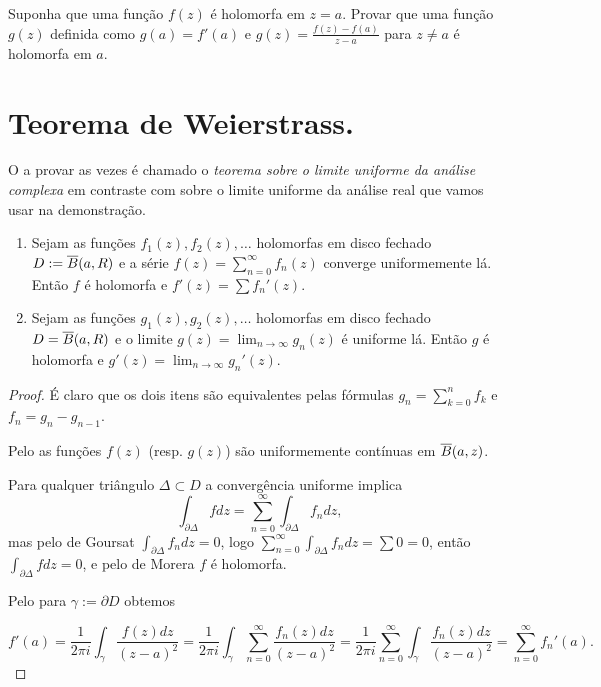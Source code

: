 \begin{problema}
Suponha que uma função $f(z)$ é holomorfa em $z=a$.
Provar que uma função $g(z)$ definida como $g(a) = f'(a)$
e $g(z) = \frac{f(z)-f(a)}{z-a}$ para $z\ne a$ é holomorfa em $a$.
\end{problema}

\section{Teorema de Weierstrass.}


O  a provar as vezes é chamado
o \emph{teorema sobre o limite uniforme da análise complexa}
em contraste com  sobre o limite uniforme da análise real
que vamos usar na demonstração.

\begin{lema}
\label{l:uniforme}
\begin{enumerate}
\item
Sejam as funções $f_1(z),f_2(z),\dots$ holomorfas em disco fechado
$D := \overline{B}(a,R)$ e a série $f(z) = \sum_{n=0}^\infty f_n(z)$ converge uniformemente lá.
Então $f$ é holomorfa e $f'(z) = \sum f_n'(z)$.
\item
Sejam as funções $g_1(z),g_2(z),\dots$ holomorfas em disco fechado
$D = \overline{B}(a,R)$ e o limite $g(z) = \lim_{n\to\infty} g_n(z)$ é uniforme lá.
Então $g$ é holomorfa e $g'(z) = \lim_{n\to\infty} g_n'(z)$.
\end{enumerate}
\end{lema}
\begin{proof}
É claro que os dois itens são equivalentes pelas fórmulas
$g_n = \sum_{k=0}^n f_k$ e $f_n = g_n - g_{n-1}$.

Pelo 
as funções $f(z)$ (resp. $g(z)$) são uniformemente contínuas em $\overline{B}(a,z)$.

Para qualquer triângulo $\Delta \subset D$ a convergência uniforme implica
\[ \int_{\partial \Delta} f dz = \sum_{n=0}^\infty \int_{\partial \Delta} f_n dz, \]
mas pelo  de Goursat $\int_{\partial \Delta} f_n dz = 0$,
logo $\sum_{n=0}^\infty \int_{\partial \Delta} f_n dz = \sum 0 = 0$,
então $\int_{\partial \Delta} f dz = 0$,
e pelo  de Morera $f$ é holomorfa.

Pelo  para $\gamma := \partial D$ obtemos

\[ f'(a) = \frac1{2\pi i} \int_{\gamma} \frac{f(z)dz}{(z-a)^2}
= \frac1{2\pi i} \int_{\gamma} \sum_{n=0}^\infty \frac{f_n(z)dz}{(z-a)^2}
= \frac1{2\pi i} \sum_{n=0}^\infty \int_{\gamma} \frac{f_n(z)dz}{(z-a)^2}
= \sum_{n=0}^\infty f_n'(a). \]
\end{proof}

